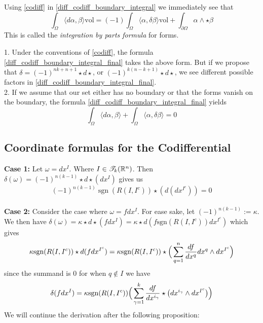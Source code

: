Using \ref{codiff} in \eqref{diff_codiff_boundary_integral} we immediately see that \begin{equation}\label{diff_codiff_boundary_integral_final}
    \int_{\Omega} \langle d\alpha,\beta\rangle \mathrm{vol}=(-1)\int_{\Omega} \langle \alpha,\delta\beta\rangle\mathrm{vol} + \int_{\partial\Omega}\alpha\wedge \star \beta
\end{equation}
This is called the \emph{integration by parts formula} for forms.
\begin{remark}
1. Under the conventions of \ref{codiff}, the formula \ref{diff_codiff_boundary_integral_final} takes the above form. But if we propose that $\delta=(-1)^{nk+n+1}\star d \star$, or $(-1)^{k(n-k+1)}\star d\star$, we see different possible factors in \ref{diff_codiff_boundary_integral_final}.
\\2. If we assume that our set either has no boundary or that the forms vanish on the boundary, the formula \ref{diff_codiff_boundary_integral_final} yields \begin{equation}\label{diff_codiff_compact}
    \int_{\Omega} \langle d\alpha,\beta\rangle + \int_{\Omega}\langle \alpha,\delta \beta \rangle=0
\end{equation}
\end{remark}

\subsection{Coordinate formulas for the Codifferential}
\textbf{Case 1:}
Let $\omega=dx^I$. Where $I\in \mathscr T_k(\mathbb{R}^n)$. Then $\delta(\omega)=(-1)^{n(k-1)}\star d\star (dx^I)$ gives us $$(-1)^{n(k-1)} \operatorname{sgn}(R(I,I^c))\star (d (dx^{I^c})) =0$$
\\ \textbf{Case 2:}  Consider the case where $\omega=fdx^I$.
For ease sake, let $(-1)^{n(k-1)}:=\kappa$. We then have $\delta(\omega)=\kappa\star d\star (fdx^I)=\kappa\star d (f \mathrm{sgn}(R(I,I^c))dx^{I^c})$
which gives $$\kappa \mathrm{sgn}(R(I,I^c)) \star d(fdx^{I^c})= \kappa\mathrm{sgn}(R(I,I^c)) \star \Big{(}\sum_{q=1}^n \frac{df}{dx^q} dx^q\wedge dx^{I^c} \Big{)}  $$
since the summand is $0$ for when $q\not\in I$ we have 
\begin{equation}\label{formula_for_codiff_step}\delta(fdx^I)=\kappa\mathrm{sgn}(R(I,I^c)) \Big{(}\sum_{\gamma=1}^k \frac{df}{dx^{i_{\gamma}}} \star \big{(}dx^{i_{\gamma}}\wedge dx^{I^c}\big{)} \Big{)} \end{equation}
We will continue the derivation after the following proposition:

